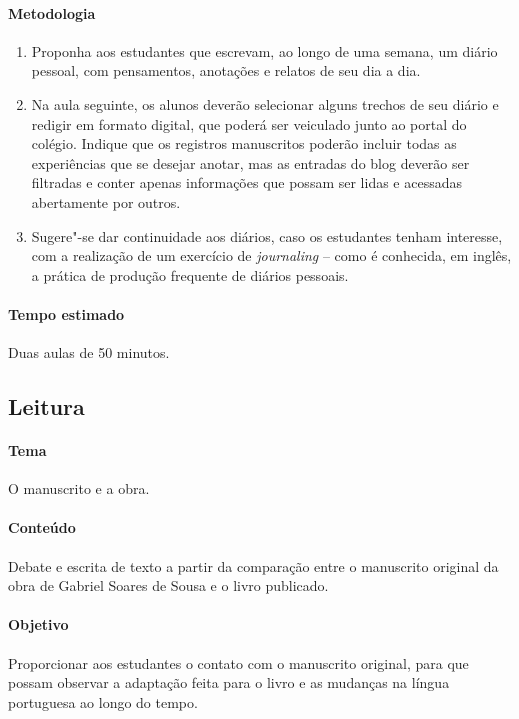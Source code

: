 \documentclass[12pt]{extarticle}
\begin{document}
\paragraph{Metodologia}

\begin{enumerate}

\item Proponha aos estudantes que escrevam, ao longo de uma semana, 
um diário pessoal, com pensamentos, anotações e relatos de seu dia a dia.

\item Na aula seguinte, os alunos deverão selecionar alguns trechos de seu diário e redigir em formato digital, que poderá ser veiculado junto ao portal do colégio. Indique que os
registros manuscritos poderão incluir todas as experiências que se
desejar anotar, mas as entradas do blog deverão ser filtradas e conter
apenas informações que possam ser lidas e acessadas abertamente por
outros.

\item  Sugere"-se dar continuidade aos diários, caso os estudantes tenham interesse, com a realização de um exercício de
\emph{journaling} -- como é conhecida, em inglês, a prática de produção
frequente de diários pessoais.

\end{enumerate} 

\paragraph{Tempo estimado} Duas aulas de 50 minutos.


\subsection{Leitura}



\paragraph{Tema} O manuscrito e a obra.

\paragraph{Conteúdo} Debate e escrita de texto a partir da comparação entre o manuscrito original da obra de Gabriel Soares de Sousa e o livro publicado.

\paragraph{Objetivo} Proporcionar aos estudantes o contato com o manuscrito original, para que possam observar a adaptação feita para o livro e as mudanças na língua portuguesa ao longo do tempo.
\end{document}
